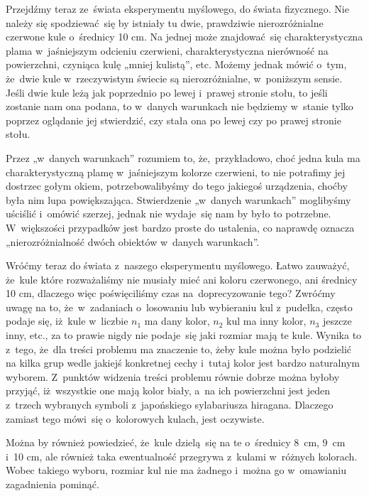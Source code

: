 \documentclass[a4paper,11pt]{article}
\begin{document}
Przejdźmy teraz ze~świata eksperymentu myślowego, do świata fizycznego. Nie
należy się spodziewać~się by istniały tu dwie, prawdziwie nierozróżnialne
czerwone kule o~średnicy 10 cm. Na jednej może znajdować~się
charakterystyczna plama w~jaśniejszym odcieniu czerwieni, charakterystyczna
nierówność na powierzchni, czyniąca kulę „mniej kulistą”, etc. Możemy jednak
mówić o~tym, że~dwie kule w~rzeczywistym świecie są nierozróżnialne,
w~poniższym sensie. Jeśli dwie kule leżą jak poprzednio po lewej i~prawej
stronie stołu, to jeśli zostanie nam ona podana, to w~danych warunkach nie
będziemy w~stanie tylko poprzez oglądanie jej stwierdzić, czy stała ona po
lewej czy po prawej stronie stołu.

Przez „w~danych warunkach” rozumiem to, że,~przykładowo, choć jedna kula ma
charakterystyczną plamę w~jaśniejszym kolorze czerwieni, to nie potrafimy
jej dostrzec gołym okiem, potrzebowalibyśmy do tego jakiegoś urządzenia,
choćby była nim lupa powiększająca. Stwierdzenie „w~danych warunkach”
moglibyśmy uściślić i~omówić szerzej, jednak nie wydaje~się nam by było to
potrzebne. W~większości przypadków jest bardzo proste do ustalenia, co
naprawdę oznacza „nierozróżnialność dwóch obiektów w~danych warunkach”.

Wróćmy teraz do świata z~naszego eksperymentu myślowego. Łatwo zauważyć,
że~kule które rozważaliśmy nie musiały mieć ani koloru czerwonego, ani
średnicy 10 cm, dlaczego więc poświęciliśmy czas na~doprecyzowanie tego?
Zwróćmy uwagę na to, że~w~zadaniach o~losowaniu lub wybieraniu kul
z~pudełka, często podaje się, iż~kule w~liczbie $n_{ 1 }$ ma dany kolor,
$n_{ 2 }$ kul ma inny kolor, $n_{ 3 }$ jeszcze inny, etc., za to prawie nigdy
nie podaje~się jaki rozmiar mają te kule. Wynika to z~tego, że~dla treści
problemu ma znaczenie to, żeby kule można było podzielić na kilka
grup wedle jakiejś konkretnej cechy i~tutaj kolor jest bardzo naturalnym
wyborem. Z~punktów widzenia treści problemu równie dobrze można byłoby
przyjąć, iż~wszystkie one mają kolor biały, a~na ich powierzchni jest jeden
z~trzech wybranych symboli z~japońskiego sylabariusza hiragana. Dlaczego
zamiast tego mówi~się o~kolorowych kulach, jest oczywiste.

Można by również powiedzieć, że~kule dzielą~się na te o~średnicy 8~cm, 9~cm
i~10 cm, ale również taka ewentualność przegrywa z~kulami w~różnych kolorach.
Wobec takiego wyboru, rozmiar kul nie ma żadnego i~można go w~omawianiu
zagadnienia pominąć.
\end{document}
